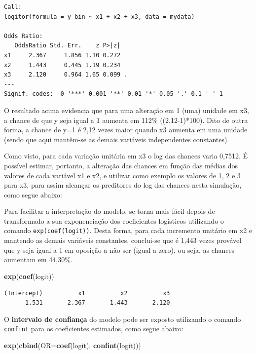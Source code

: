 \documentclass[12pt,brazil,oneside]{book}
\newenvironment{Shaded}{\begin{snugshade}}{\end{snugshade}}
\newcommand{\DataTypeTok}[1]{\textcolor[rgb]{0.13,0.29,0.53}{#1}}
\newcommand{\KeywordTok}[1]{\textcolor[rgb]{0.13,0.29,0.53}{\textbf{#1}}}
\newcommand{\NormalTok}[1]{#1}
\begin{document}
\begin{verbatim}
Call:
logitor(formula = y_bin ~ x1 + x2 + x3, data = mydata)

Odds Ratio:
   OddsRatio Std. Err.    z P>|z|  
x1     2.367     1.856 1.10 0.272  
x2     1.443     0.445 1.19 0.234  
x3     2.120     0.964 1.65 0.099 .
---
Signif. codes:  0 '***' 0.001 '**' 0.01 '*' 0.05 '.' 0.1 ' ' 1
\end{verbatim}

O resultado acima evidencia que para uma alteração em 1 (uma) unidade em x3, a chance de que y seja igual a 1 aumenta em 112\% ((2,12-1)*100). Dito de outra forma, a chance de y=1 é 2,12 vezes maior quando x3 aumenta em uma unidade (sendo que aqui mantêm-se as demais variáveis independentes constantes).

Como visto, para cada variação unitária em x3 o log das chances varia 0,7512. É possível estimar, portanto, a alteração das chances em função das médias dos valores de cada variável x1 e x2, e utilizar como exemplo os valores de 1, 2 e 3 para x3, para assim alcançar os preditores do log das chances nesta simulação, como segue abaixo:

Para facilitar a interpretação do modelo, se torna mais fácil depois de transformado a sua exponenciação dos coeficientes logísticos utilizando o comando \texttt{exp(coef(logit))}. Desta forma, para cada incremento unitário em x2 e mantendo as demais variáveis constantes, conclui-se que é 1,443 vezes provável que y seja igual a 1 em oposição a não ser (igual a zero), ou seja, as chances aumentam em 44,30\%.

\begin{Shaded}
\begin{Highlighting}[]
\KeywordTok{exp}\NormalTok{(}\KeywordTok{coef}\NormalTok{(logit))}
\end{Highlighting}
\end{Shaded}

\begin{verbatim}
(Intercept)          x1          x2          x3 
      1.531       2.367       1.443       2.120 
\end{verbatim}

O \textbf{intervalo de confiança} do modelo pode ser exposto utilizando o comando \texttt{confint} para os coeficientes estimados, como segue abaixo:

\begin{Shaded}
\begin{Highlighting}[]
\KeywordTok{exp}\NormalTok{(}\KeywordTok{cbind}\NormalTok{(}\DataTypeTok{OR=}\KeywordTok{coef}\NormalTok{(logit), }\KeywordTok{confint}\NormalTok{(logit)))}
\end{Highlighting}
\end{Shaded}
\end{document}
